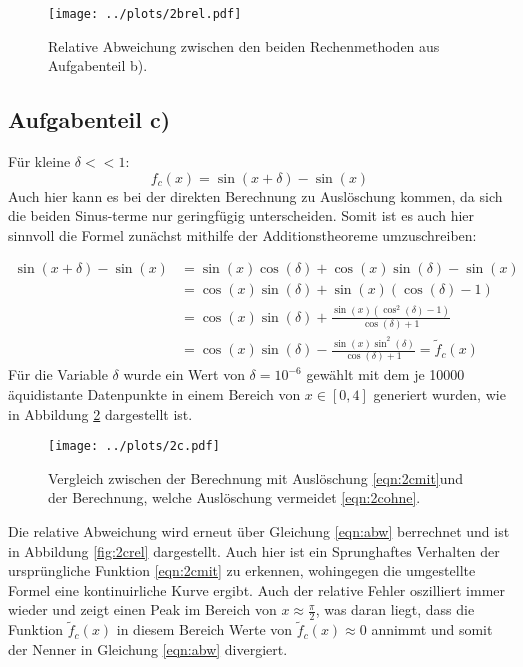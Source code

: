 \begin{figure}[H]
  \centering
  \texttt{[image: ../plots/2brel.pdf]}
  \caption{Relative Abweichung zwischen den beiden Rechenmethoden aus Aufgabenteil b).}
  \label{fig:2brel}
\end{figure}

\subsection*{Aufgabenteil c)}
Für kleine $\delta<<1$:
\begin{equation}
  f_c(x)=\sin(x+\delta)-\sin(x)
  \label{eqn:2cmit}
\end{equation}
Auch hier kann es bei der direkten Berechnung zu Auslöschung kommen, da sich die beiden Sinus-terme nur geringfügig unterscheiden.
Somit ist es auch hier sinnvoll die Formel zunächst mithilfe der Additionstheoreme umzuschreiben:

\begin{align}
  \sin(x+\delta)-\sin(x) &=\sin(x)\cos(\delta)+\cos(x)\sin(\delta)-\sin(x) \\
  &= \cos(x)\sin(\delta) +\sin(x)(\cos(\delta)-1) \\
  &= \cos(x)\sin(\delta) + \frac{\sin(x)(\cos^2(\delta)-1)}{\cos(\delta)+1} \\
  &= \cos(x)\sin(\delta) - \frac{\sin(x)\sin^2(\delta)}{\cos(\delta)+1}=\tilde{f}_c(x)
  \label{eqn:2cohne}
\end{align}
Für die Variable $\delta$ wurde ein Wert von $\delta=10^{-6}$ gewählt mit dem je 10000 äquidistante
Datenpunkte in einem Bereich von $x\in[0,4]$ generiert wurden, wie in Abbildung \ref{fig:2c} dargestellt ist.

\begin{figure}[H]
  \centering
  \texttt{[image: ../plots/2c.pdf]}
  \caption{Vergleich zwischen der Berechnung mit Auslöschung \eqref{eqn:2cmit}und der Berechnung, welche Auslöschung vermeidet \eqref{eqn:2cohne}.}
  \label{fig:2c}
\end{figure}

Die relative Abweichung wird erneut über Gleichung \eqref{eqn:abw} berrechnet und ist in Abbildung \ref{fig:2crel} dargestellt. Auch hier ist ein Sprunghaftes Verhalten der ursprüngliche Funktion \eqref{eqn:2cmit} zu erkennen, wohingegen die umgestellte Formel eine kontinuirliche Kurve ergibt.
Auch der relative Fehler oszilliert immer wieder und zeigt einen Peak im Bereich von $x\approx\frac{\pi}{2}$, was daran liegt, dass die Funktion $\tilde{f}_c(x)$ in diesem Bereich Werte von $\tilde{f}_c(x)\approx 0$ annimmt und somit der Nenner in Gleichung \eqref{eqn:abw} divergiert.


